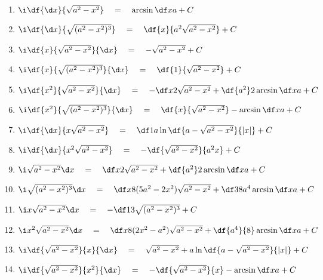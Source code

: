 \begin{enumerate}
\bigskip
{\bf （八）含有$\sqrt{a^2-x^2}\;(a>0)$的积分}\ps{$x=a\sin t$}
  \item $\i\df{{\d x}}{\sqrt{a^2-x^2}}\quad=\quad\arcsin\df xa+C$
  \item $\i\df{{\d x}}{\sqrt{(a^2-x^2)^3}}\quad=\quad\df{x}{a^2\sqrt{a^2-x^2}}+C$
  \item $\i\df{x}{\sqrt{a^2-x^2}}{\d x}\quad=\quad-\sqrt{a^2-x^2}+C$
  \item $\i\df{x}{\sqrt{(a^2-x^2)^3}}{\d x}\quad=\quad\df{1}{\sqrt{a^2-x^2}}+C$
  \item $\i\df{x^2}{\sqrt{a^2-x^2}}{\d x}\quad=\quad-\df x2\sqrt{a^2-x^2}+\df{a^2}2\arcsin\df
  xa+C$
  \item $\i\df{x^2}{\sqrt{(a^2-x^2)^3}}{\d x}\quad=\quad\df{x}{\sqrt{a^2-x^2}}-\arcsin\df
  xa+C$
  \item $\i\df{{\d x}}{x\sqrt{a^2-x^2}}\quad=\quad\df 1a\ln\df{a-\sqrt{a^2-x^2}}{|x|}+C$
  \item $\i\df{{\d x}}{x^2\sqrt{a^2-x^2}}\quad=\quad-\df{\sqrt{a^2-x^2}}{a^2x}+C$
  \item $\i\sqrt{a^2-x^2}{\d x}\quad=\quad\df x2 \sqrt{a^2-x^2}+\df{a^2}2\arcsin\df xa+C$
  \item $\i\sqrt{(a^2-x^2)^3}{\d x}\quad=\quad\df x8(5a^2-2x^2)\sqrt{a^2-x^2}
  +\df 38a^4\arcsin\df xa+C$
  \item $\i x\sqrt{a^2-x^2}{\d x}\quad=\quad-\df 13\sqrt{(a^2-x^2)^3}+C$
  \item $\i x^2\sqrt{a^2-x^2}{\d x}\quad=\quad\df x8(2x^2-a^2)\sqrt{a^2-x^2}+
  \df{a^4}{8}\arcsin\df xa+C$
  \item
  $\i\df{\sqrt{a^2-x^2}}{x}{\d x}\quad=\quad\sqrt{a^2-x^2}+a\ln\df{a-\sqrt{a^2-x^2}}{|x|}+C$
  \item $\i\df{\sqrt{a^2-x^2}}{x^2}{\d x}\quad=\quad-\df{\sqrt{a^2-x^2}}{x}-\arcsin\df xa+C$


\end{enumerate}
